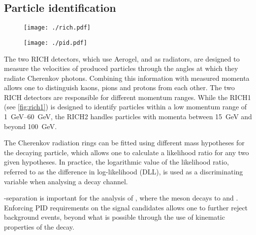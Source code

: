 \subsection{Particle identification}

\begin{figure}
  \begin{minipage}{.45\textwidth}
    \centering
    \texttt{[image: ./rich.pdf]}
    \captionsetup{width=0.8\textwidth}
    \label{fig:rich1}
  \end{minipage}%
  \begin{minipage}{.55\textwidth}
    \centering
    \texttt{[image: ./pid.pdf]}
    \captionsetup{width=0.8\textwidth}
    \label{fig:pid}
  \end{minipage}
\end{figure}

The two \gls{RICH} detectors, which use Aerogel,  and  as radiators, are designed to measure the velocities of produced particles through the angles at which they radiate Cherenkov photons.
Combining this information with measured momenta allows one to distinguish kaons, pions and protons from each other.
The two \gls{RICH} detectors are responsible for different momentum ranges.
While the RICH1 (see \ref{fig:rich1}) is designed to identify particles within a low momentum range of \SIrange{1}{60}{GeV}, the RICH2 handles particles with momenta between \SI{15}{GeV} and beyond \SI{100}{GeV}.

The Cherenkov radiation rings can be fitted using different mass hypotheses for the decaying particle, which allows one to calculate a likelihood ratio for any two given hypotheses.
In practice, the logarithmic value of the likelihood ratio, referred to as the difference in log-likelihood (DLL), is used as a discriminating variable when analysing a decay channel.

\PK-\Pgp separation is important for the analysis of \decay, where the \APDzero meson decays to \PKp and \Pgpm.
Enforcing \gls{PID} requirements on the signal candidates allows one to further reject background events, beyond what is possible through the use of kinematic properties of the decay.

